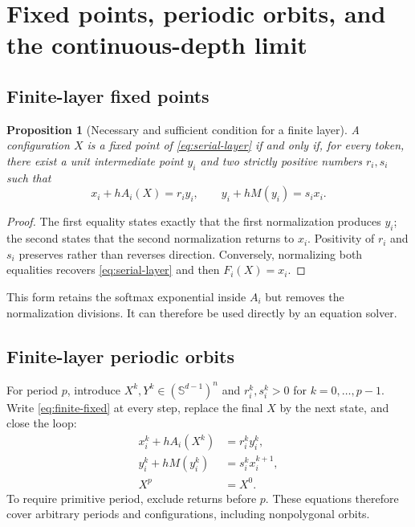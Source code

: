 \documentclass[11pt,a4paper]{article}
\newtheorem{proposition}[theorem]{Proposition}
\theoremstyle{definition}
\newcommand{\sphere}{\mathbb S}
\begin{document}
\section{Fixed points, periodic orbits, and the continuous-depth limit}
\label{sec:exact-equations}

\subsection{Finite-layer fixed points}

\begin{proposition}[Necessary and sufficient condition for a finite layer]
A configuration $X$ is a fixed point of \eqref{eq:serial-layer} if and only if, for
every token, there exist a unit intermediate point $y_i$ and two strictly positive
numbers $r_i,s_i$ such that
\begin{equation}
 x_i+hA_i(X)=r_i y_i,\qquad
 y_i+hM(y_i)=s_i x_i.\label{eq:finite-fixed}
\end{equation}
\end{proposition}

\begin{proof}
The first equality states exactly that the first normalization produces $y_i$; the
second states that the second normalization returns to $x_i$. Positivity of $r_i$ and
$s_i$ preserves rather than reverses direction. Conversely, normalizing both
equalities recovers \eqref{eq:serial-layer} and then $F_i(X)=x_i$.
\end{proof}

This form retains the softmax exponential inside $A_i$ but removes the normalization
divisions. It can therefore be used directly by an equation solver.

\subsection{Finite-layer periodic orbits}

For period $p$, introduce $X^k,Y^k\in(\sphere^{d-1})^n$ and
$r_i^k,s_i^k>0$ for $k=0,\ldots,p-1$. Write \eqref{eq:finite-fixed} at every step, replace the final
$X$ by the next state, and close the loop:
\begin{align}
 x_i^k+hA_i(X^k)&=r_i^k y_i^k,\\
 y_i^k+hM(y_i^k)&=s_i^k x_i^{k+1},\\
 X^p&=X^0.\label{eq:all-cycles}
\end{align}
To require primitive period, exclude returns before $p$. These equations therefore
cover arbitrary periods and configurations, including nonpolygonal orbits.
\end{document}
